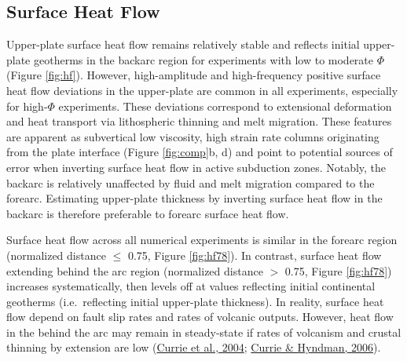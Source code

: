 \hypertarget{surface-heat-flow}{%
\subsection{Surface Heat Flow}\label{surface-heat-flow}}

Upper-plate surface heat flow remains relatively stable and reflects initial upper-plate geotherms in the backarc region for experiments with low to moderate \(\Phi\) (Figure \ref{fig:hf}). However, high-amplitude and high-frequency positive surface heat flow deviations in the upper-plate are common in all experiments, especially for high-\(\Phi\) experiments. These deviations correspond to extensional deformation and heat transport via lithospheric thinning and melt migration. These features are apparent as subvertical low viscosity, high strain rate columns originating from the plate interface (Figure \ref{fig:comp}b, d) and point to potential sources of error when inverting surface heat flow in active subduction zones. Notably, the backarc is relatively unaffected by fluid and melt migration compared to the forearc. Estimating upper-plate thickness by inverting surface heat flow in the backarc is therefore preferable to forearc surface heat flow.

Surface heat flow across all numerical experiments is similar in the forearc region (normalized distance \(\leq\) 0.75, Figure \ref{fig:hf78}). In contrast, surface heat flow extending behind the arc region (normalized distance \(>\) 0.75, Figure \ref{fig:hf78}) increases systematically, then levels off at values reflecting initial continental geotherms (i.e.~reflecting initial upper-plate thickness). In reality, surface heat flow depend on fault slip rates and rates of volcanic outputs. However, heat flow in the behind the arc may remain in steady-state if rates of volcanism and crustal thinning by extension are low (\protect\hyperlink{ref-currie2004}{Currie et al., 2004}; \protect\hyperlink{ref-currie2006}{Currie \& Hyndman, 2006}).

